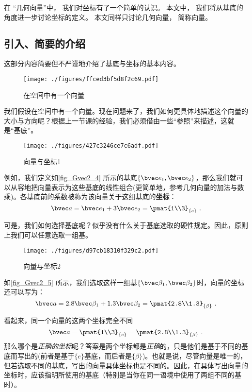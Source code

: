 


在 “几何向量”中， 我们对坐标有了一个简单的认识。 本文中， 我们将从基底的角度进一步讨论坐标的定义。 本文同样只讨论几何向量， 简称向量。

\subsection{引入、简要的介绍}
这部分内容简要但不严谨地介绍了基底与坐标的基本内容。
\begin{figure}[ht]
\centering
\texttt{[image: ./figures/ffced3bf5d8f2c69.pdf]}
\caption{在空间中有一个向量} \label{fig_Gvec2_3}
\end{figure}

我们假设在空间中有一个向量。现在问题来了，我们如何更具体地描述这个向量的大小与方向呢？根据上一节课的经验，我们必须借由一些“参照”来描述，这就是“基底”。

\begin{figure}[ht]
\centering
\texttt{[image: ./figures/427c3246ce7c6adf.pdf]}
\caption{向量与坐标1} \label{fig_Gvec2_4}
\end{figure}
例如，我们定义如\autoref{fig_Gvec2_4} 所示的基底$\{\bvec e_1,\bvec e_2\}$，那么我们就可以从容地把向量表示为这些基底的线性组合(更简单地，参考几何向量的加法与数乘)。各基底前的系数被称为该向量关于这组基底的\textbf{坐标}：
$$\bvec a = \bvec e_1 + 3\bvec e_2=
\pmat{1\\3}_{\{e\}}~.$$

可是，我们如何选择基底呢？似乎没有什么关于基底选取的硬性规定。因此，原则上我们可以任意选取一组基。
\begin{figure}[ht]
\centering
\texttt{[image: ./figures/d97cb18310f329c2.pdf]}
\caption{向量与坐标2} \label{fig_Gvec2_5}
\end{figure}
如\autoref{fig_Gvec2_5} 所示，我们选取这样一组基$\{\bvec \beta_1,\bvec \beta_2\}$时，向量的坐标还可以写为：
$$\bvec a = 2.8 \bvec \beta_1 + 1.3 \bvec \beta_2=
\pmat{2.8\\1.3}_{\{\beta\}}~.$$

看起来，同一个向量的这两个坐标完全不同
$$\bvec a = \pmat{1\\3}_{\{e\}} =
\pmat{2.8\\1.3}_{\{\beta\}}~.$$
那么哪个是\textsl{正确的坐标}呢？答案是两个坐标都是\textsl{正确}的，只是他们是基于不同的基底而写出的(前者是基于$\{e\}$基底，而后者是$\{\beta\}$)。也就是说，尽管向量是唯一的，但若选取不同的基底，写出的向量具体坐标也是不同的。因此，在具体写出向量的坐标时，应该指明所使用的基底（特别是当你在同一语境中使用了两组不同的基时）。

